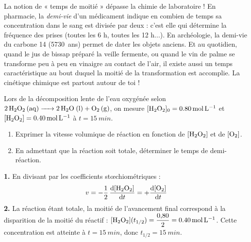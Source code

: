 \documentclass[11pt]{article}
\begin{document}
\begin{savaistu}
La notion de « temps de moitié » dépasse la chimie de laboratoire ! En pharmacie, la \emph{demi-vie} d'un médicament indique en combien de temps sa concentration dans le sang est divisée par deux : c'est elle qui détermine la fréquence des prises (toutes les 6 h, toutes les 12 h...). En archéologie, la demi-vie du carbone 14 (\SI{5730}{ans}) permet de dater les objets anciens. Et au quotidien, quand le jus de bissap préparé la veille fermente, ou quand le vin de palme se transforme peu à peu en vinaigre au contact de l'air, il existe aussi un temps caractéristique au bout duquel la moitié de la transformation est accomplie. La cinétique chimique est partout autour de toi !
\end{savaistu}

\begin{exercice}
Lors de la décomposition lente de l'eau oxygénée selon $\ce{2H2O2 (aq) -> 2H2O (l) + O2 (g)}$, on mesure $[\ce{H2O2}]_0 = \SI{0,80}{mol.L^{-1}}$ et $[\ce{H2O2}] = \SI{0,40}{mol.L^{-1}}$ à $t = \SI{15}{min}$.
\begin{enumerate}
\item Exprimer la vitesse volumique de réaction en fonction de $[\ce{H2O2}]$ et de $[\ce{O2}]$.
\item En admettant que la réaction soit totale, déterminer le temps de demi-réaction.
\end{enumerate}
\end{exercice}

\begin{corrige}[Exercice 1]
\textbf{1.} En divisant par les coefficients stœchiométriques :
\[ v = -\frac{1}{2}\,\frac{\mathrm{d}[\ce{H2O2}]}{\mathrm{d}t} = +\frac{\mathrm{d}[\ce{O2}]}{\mathrm{d}t} \]
\textbf{2.} La réaction étant totale, la moitié de l'avancement final correspond à la disparition de la moitié du réactif : $[\ce{H2O2}](t_{1/2}) = \dfrac{0{,}80}{2} = \SI{0,40}{mol.L^{-1}}$. Cette concentration est atteinte à $t = \SI{15}{min}$, donc $t_{1/2} = \SI{15}{min}$.
\end{corrige}
\end{document}
